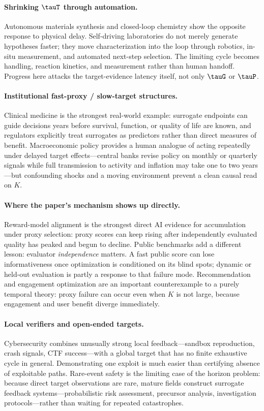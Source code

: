 \paragraph{Shrinking $\tauT$ through automation.}
Autonomous materials synthesis and closed-loop chemistry show the opposite response to physical delay. Self-driving laboratories do not merely generate hypotheses faster; they move characterization into the loop through robotics, in-situ measurement, and automated next-step selection. The limiting cycle becomes handling, reaction kinetics, and measurement rather than human handoff. Progress here attacks the target-evidence latency itself, not only $\tauG$ or $\tauP$.

\paragraph{Institutional fast-proxy / slow-target structures.}
Clinical medicine is the strongest real-world example: surrogate endpoints can guide decisions years before survival, function, or quality of life are known, and regulators explicitly treat surrogates as predictors rather than direct measures of benefit. Macroeconomic policy provides a human analogue of acting repeatedly under delayed target effects---central banks revise policy on monthly or quarterly signals while full transmission to activity and inflation may take one to two years---but confounding shocks and a moving environment prevent a clean causal read on $K$.

\paragraph{Where the paper's mechanism shows up directly.}
Reward-model alignment is the strongest direct AI evidence for accumulation under proxy selection: proxy scores can keep rising after independently evaluated quality has peaked and begun to decline. Public benchmarks add a different lesson: evaluator \emph{independence} matters. A fast public score can lose informativeness once optimization is conditioned on its blind spots; dynamic or held-out evaluation is partly a response to that failure mode. Recommendation and engagement optimization are an important counterexample to a purely temporal theory: proxy failure can occur even when $K$ is not large, because engagement and user benefit diverge immediately.

\paragraph{Local verifiers and open-ended targets.}
Cybersecurity combines unusually strong local feedback---sandbox reproduction, crash signals, CTF success---with a global target that has no finite exhaustive cycle in general. Demonstrating one exploit is much easier than certifying absence of exploitable paths. Rare-event safety is the limiting case of the horizon problem: because direct target observations are rare, mature fields construct surrogate feedback systems---probabilistic risk assessment, precursor analysis, investigation protocols---rather than waiting for repeated catastrophes.

